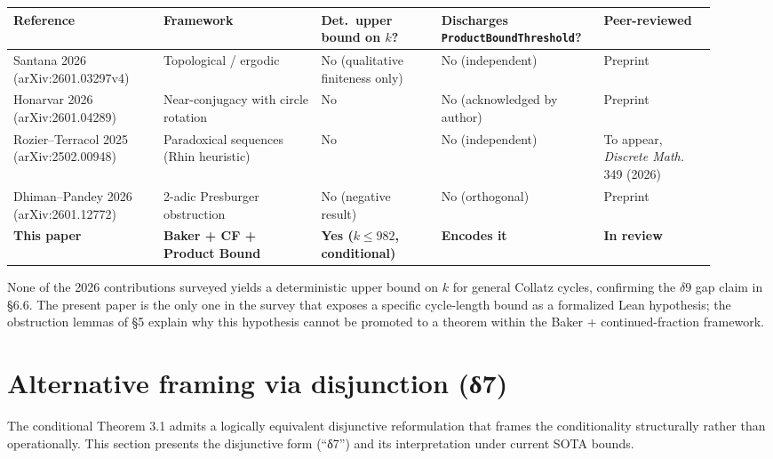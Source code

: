 \documentclass[
  11pt]{amsart}
\theoremstyle{plain}
\theoremstyle{definition}
\theoremstyle{remark}
\begin{document}
{\footnotesize
\begin{tabular}{@{}p{0.20\linewidth}p{0.21\linewidth}p{0.16\linewidth}p{0.20\linewidth}p{0.15\linewidth}@{}}
\toprule
\textbf{Reference} & \textbf{Framework} & \textbf{Det.\ upper bound on $k$?} & \textbf{Discharges \texttt{ProductBoundThreshold}?} & \textbf{Peer-reviewed} \\
\midrule
Santana 2026 \newline (arXiv:2601.03297v4) &
Topological / ergodic &
No (qualitative finiteness only) &
No (independent) &
Preprint \\
\addlinespace
Honarvar 2026 \newline (arXiv:2601.04289) &
Near-conjugacy with circle rotation &
No &
No (acknowledged by author) &
Preprint \\
\addlinespace
Rozier–Terracol 2025 \newline (arXiv:2502.00948) &
Paradoxical sequences (Rhin heuristic) &
No &
No (independent) &
To appear, \emph{Discrete Math.} 349 (2026) \\
\addlinespace
Dhiman–Pandey 2026 \newline (arXiv:2601.12772) &
2-adic Presburger obstruction &
No (negative result) &
No (orthogonal) &
Preprint \\
\addlinespace
\textbf{This paper} &
\textbf{Baker + CF + Product Bound} &
\textbf{Yes ($k \leq 982$, conditional)} &
\textbf{Encodes it} &
\textbf{In review} \\
\bottomrule
\end{tabular}}

None of the 2026 contributions surveyed yields a deterministic upper
bound on \(k\) for general Collatz cycles, confirming the \(\delta 9\)
gap claim in §6.6. The present paper is the only one in the survey that
exposes a specific cycle-length bound as a formalized Lean hypothesis;
the obstruction lemmas of §5 explain why this hypothesis cannot be
promoted to a theorem within the Baker + continued-fraction framework.

\section{Alternative framing via disjunction
(δ7)}\label{alternative-framing-via-disjunction-ux3b47}

The conditional Theorem 3.1 admits a logically equivalent disjunctive
reformulation that frames the conditionality structurally rather than
operationally. This section presents the disjunctive form (``δ7'') and
its interpretation under current SOTA bounds.
\end{document}
